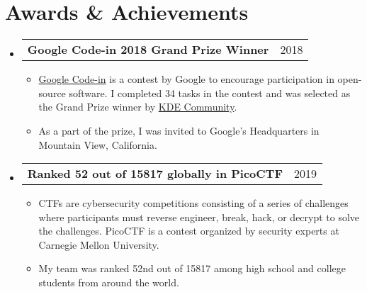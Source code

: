 \documentclass[letterpaper,11pt]{article}
\makeatletter
\newcommand{\sresumeItem}[1]{
  \item\small{
    { #1 \vspace{-2pt}}
  }
}
\newcommand{\shortResumeSubheading}[2]{
  \vspace{-1pt}\item
    \begin{tabular*}{0.97\textwidth}[t]{l@{\extracolsep{\fill}}r}
      \textbf{#1} & #2 \\
    \end{tabular*}
  \vspace{-5pt}
}
\newcommand{\resumeSubHeadingListStart}{\begin{itemize}[leftmargin=*]}
\newcommand{\resumeSubHeadingListEnd}{\end{itemize}}
\newcommand{\resumeItemListStart}{\begin{itemize}}
\newcommand{\resumeItemListEnd}{\end{itemize}\vspace{-5pt}}
\makeatother
\begin{document}
\section{Awards \& Achievements}
  \resumeSubHeadingListStart

    \shortResumeSubheading
      {Google Code-in 2018 Grand Prize Winner}{2018}
      \resumeItemListStart
        \sresumeItem
          {\href{http://g.co/gci/}{Google Code-in} is a contest by Google to encourage participation in open-source software. I completed 34 tasks in the contest and was selected as the Grand Prize winner by \href{https://kde.org/}{KDE Community}.}
        \sresumeItem
          {As a part of the prize, I was invited to Google's Headquarters in Mountain View, California.}
      \resumeItemListEnd

    \shortResumeSubheading
      {Ranked 52 out of 15817 globally in PicoCTF}{2019}
      \resumeItemListStart
        \sresumeItem
          {CTFs are cybersecurity competitions consisting of a series of challenges where participants must reverse engineer, break, hack, or decrypt to solve the challenges. PicoCTF is a contest organized by security experts at Carnegie Mellon University.}
        \sresumeItem
          {My team was ranked 52nd out of 15817 among high school and college students from around the world.}
      \resumeItemListEnd

  \resumeSubHeadingListEnd

\end{document}
